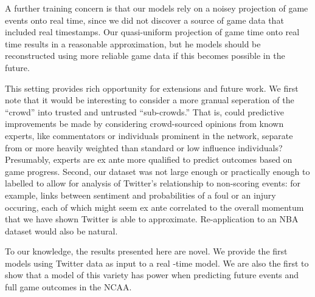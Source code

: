\documentclass[12pt]{article}
\begin{document}
\begin{doublespacing}
A further training concern is that
our models rely on a noisey projection of game 
events onto real time, since we did not discover a 
source of game data that included real timestamps. 
Our quasi-uniform projection of game time onto real time
results in a reasonable approximation, but he models
should be reconstructed 
using more reliable game data if this becomes possible
in the future. 

This setting provides rich opportunity for extensions
and future work. We first note that it would be interesting
to consider a more granual seperation of the ``crowd'' into
trusted and untrusted ``sub-crowds.'' That is, could
predictive improvements be made by considering crowd-sourced
opinions from known experts, like commentators or individuals
prominent in the network, separate from or more heavily weighted
than standard or low influence individuals? Presumably, experts
are ex ante more qualified to predict outcomes based on 
game progress. Second, our dataset was not large enough
or practically enough to labelled to allow for analysis
of Twitter's relationship to non-scoring events: for
example, links between sentiment and probabilities of 
a foul or an injury occuring, each of which might seem ex ante
correlated to the overall momentum that we have shown Twitter
is able to approximate. Re-application to an NBA dataset
would also be natural. 

To our knowledge, the results presented here are novel.
We provide the first models using Twitter data as input to a real
-time model. We are also the first to show that a model of this
variety has power when predicting future events and full game
outcomes in the NCAA. 

\end{doublespacing}
\end{document}
